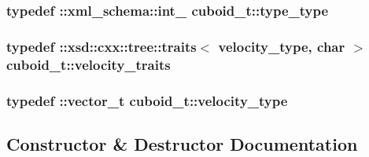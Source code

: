 \subsubsection[{\texorpdfstring{type\+\_\+type}{type_type}}]{\setlength{\rightskip}{0pt plus 5cm}typedef \+::{\bf xml\+\_\+schema\+::int\+\_\+} {\bf cuboid\+\_\+t\+::type\+\_\+type}}\hypertarget{classcuboid__t_a6fb75392e8d31d56062e18b6aa2adc8a}{}\label{classcuboid__t_a6fb75392e8d31d56062e18b6aa2adc8a}
\subsubsection[{\texorpdfstring{velocity\+\_\+traits}{velocity_traits}}]{\setlength{\rightskip}{0pt plus 5cm}typedef \+::xsd\+::cxx\+::tree\+::traits$<$ {\bf velocity\+\_\+type}, char $>$ {\bf cuboid\+\_\+t\+::velocity\+\_\+traits}}\hypertarget{classcuboid__t_ae9e44d76c104412fa2f0fb02e0b8b6f2}{}\label{classcuboid__t_ae9e44d76c104412fa2f0fb02e0b8b6f2}
\subsubsection[{\texorpdfstring{velocity\+\_\+type}{velocity_type}}]{\setlength{\rightskip}{0pt plus 5cm}typedef \+::{\bf vector\+\_\+t} {\bf cuboid\+\_\+t\+::velocity\+\_\+type}}\hypertarget{classcuboid__t_a71c58ac42113feacf576245bc43d8dde}{}\label{classcuboid__t_a71c58ac42113feacf576245bc43d8dde}


\subsection{Constructor \& Destructor Documentation}
